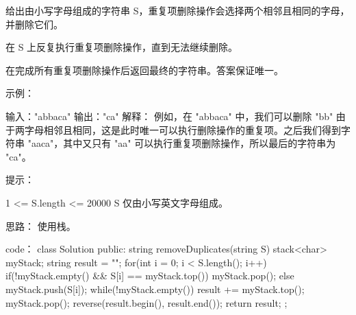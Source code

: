 给出由小写字母组成的字符串 S，重复项删除操作会选择两个相邻且相同的字母，并删除它们。

在 S 上反复执行重复项删除操作，直到无法继续删除。

在完成所有重复项删除操作后返回最终的字符串。答案保证唯一。

 

示例：

输入："abbaca"
输出："ca"
解释：
例如，在 "abbaca" 中，我们可以删除 "bb" 由于两字母相邻且相同，这是此时唯一可以执行删除操作的重复项。之后我们得到字符串 "aaca"，其中又只有 "aa" 可以执行重复项删除操作，所以最后的字符串为 "ca"。

 

提示：

    1 <= S.length <= 20000
    S 仅由小写英文字母组成。























思路：
使用栈。























code：
class Solution {
public:
    string removeDuplicates(string S) {
        stack<char> myStack;
        string result = "";
        for(int i = 0; i < S.length(); i++)
        {
            if(!myStack.empty() && S[i] == myStack.top())
                myStack.pop();
            else myStack.push(S[i]);
        }
        while(!myStack.empty())
        {
            result += myStack.top();
            myStack.pop();
        }
        reverse(result.begin(), result.end());
        return result;
    }
};